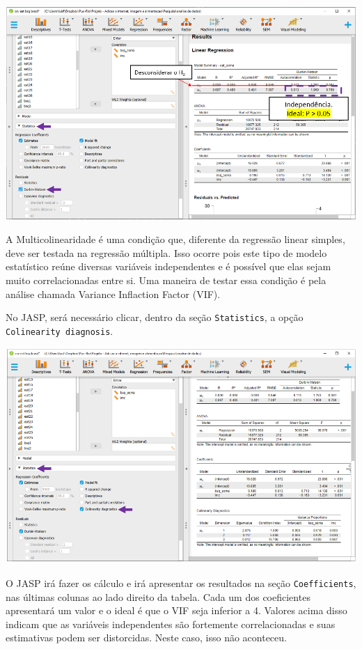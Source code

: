 \documentclass[
]{book}
\begin{document}
\includegraphics{./img/cap_reg_multipla_ind_residuos2.png}

A Multicolinearidade é uma condição que, diferente da regressão linear simples, deve ser testada na regressão múltipla. Isso ocorre pois este tipo de modelo estatístico reúne diversas variáveis independentes e é possível que elas sejam muito correlacionadas entre si. Uma maneira de testar essa condição é pela análise chamada Variance Inflaction Factor (VIF).

No JASP, será necessário clicar, dentro da seção \texttt{Statistics}, a opção \texttt{Colinearity\ diagnosis}.

\includegraphics{./img/cap_reg_multipla_colinearidade_jasp.png}

O JASP irá fazer os cálculo e irá apresentar os resultados na seção \texttt{Coefficients}, nas últimas colunas ao lado direito da tabela. Cada um dos coeficientes apresentará um valor e o ideal é que o VIF seja inferior a 4. Valores acima disso indicam que as variáveis independentes são fortemente correlacionadas e suas estimativas podem ser distorcidas. Neste caso, isso não aconteceu.
\end{document}
